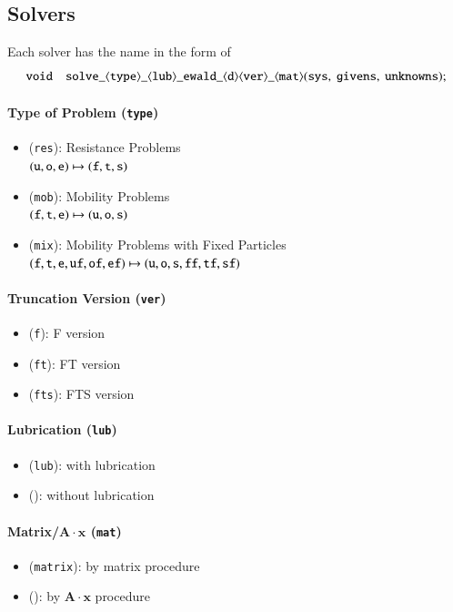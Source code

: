 \documentclass{book}
\begin{document}
\subsection{Solvers}
Each solver has the name in the form of
\begin{equation}
  {\tt void\quad solve\_\langle type\rangle\_\langle lub\rangle\_ewald\_\langle d\rangle\langle ver\rangle\_\langle mat\rangle(sys,\ givens,\ unknowns);}
\end{equation}

\paragraph{Type of Problem ({\tt type})}
\begin{itemize}
\item ({\tt res}): Resistance Problems\\
  $({\tt u, o, e}) \mapsto ({\tt f, t, s})$
\item ({\tt mob}): Mobility Problems\\
  $({\tt f, t, e}) \mapsto ({\tt u, o, s})$
\item ({\tt mix}): Mobility Problems with Fixed Particles\\
  $({\tt f, t, e, uf, of, ef}) \mapsto ({\tt u, o, s, ff, tf, sf})$
\end{itemize}

\paragraph{Truncation Version ({\tt ver})}
\begin{itemize}
\item ({\tt f}): F version
\item ({\tt ft}): FT version
\item ({\tt fts}): FTS version
\end{itemize}

\paragraph{Lubrication ({\tt lub})}
\begin{itemize}
\item ({\tt lub}): with lubrication
\item (): without lubrication
\end{itemize}

\paragraph{Matrix/$\bm{A}\cdot\bm{x}$ ({\tt mat})}
\begin{itemize}
\item ({\tt matrix}): by matrix procedure
\item (): by $\bm{A}\cdot\bm{x}$ procedure
\end{itemize}
\end{document}

